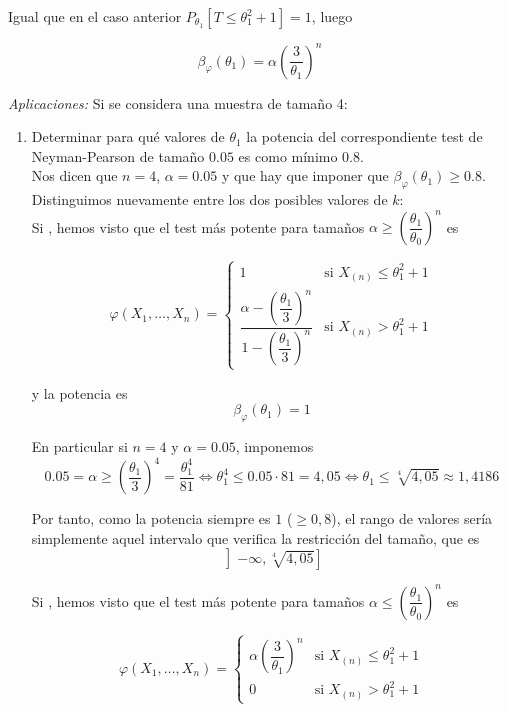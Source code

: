 \documentclass[12pt]{article}
\begin{document}
\begin{ejercicio}
        Igual que en el caso anterior $P_{\theta_1}[T \leq \theta_1^2 + 1] = 1$, luego

        $$\beta_{\varphi}(\theta_1) = \alpha \left( \dfrac{3}{\theta_1} \right)^{n}$$

        \textit{Aplicaciones:} Si se considera una muestra de tamaño 4:
        \begin{enumerate}[label=\alph*)]
            \item Determinar para qué valores de $\theta_1$ la potencia del correspondiente test de Neyman-Pearson de tamaño $0.05$ es como mínimo $0.8$. \\
            
            Nos dicen que $n=4$, $\alpha = 0.05$ y que hay que imponer que $\beta_{\varphi}(\theta_1) \geq 0.8$. Distinguimos nuevamente
            entre los dos posibles valores de $k$: \\

            Si , hemos visto que el test más potente para tamaños $\alpha \geq \left( \dfrac{\theta_1}{\theta_0} \right)^{n}$ es

            $$\varphi(X_1, \ldots, X_n) = 
            \begin{cases}
                1 &\text{si } X_{(n)} \leq \theta_1^2 + 1 \\
                \dfrac{\alpha - \left( \dfrac{\theta_1}{3} \right)^{n}}{1 - \left( \dfrac{\theta_1}{3} \right)^{n}} &\text{si } X_{(n)} > \theta_1^2 + 1
            \end{cases}$$  

            y la potencia es $$\beta_{\varphi}(\theta_1) = 1$$

            En particular si $n=4$ y $\alpha = 0.05$, imponemos
            $$0.05 = \alpha \geq \left( \dfrac{\theta_1}{3} \right)^{4} = \dfrac{\theta_1^4}{81} \iff \theta_1^4 \leq 0.05 \cdot 81 = 4,05 \iff
            \theta_1 \leq \sqrt[4]{4,05} \approx 1,4186$$

            Por tanto, como la potencia siempre es $1$ ($\geq 0,8$), el rango de valores sería simplemente aquel intervalo que verifica
            la restricción del tamaño, que es $$\left]-\infty, \sqrt[4]{4,05} \right]$$ 

            \newpage

            Si , hemos visto que el test más potente para tamaños $\alpha \leq \left( \dfrac{\theta_1}{\theta_0} \right)^{n}$ es

            $$\varphi(X_1, \ldots, X_n) = 
            \begin{cases}
                \alpha \left( \dfrac{3}{\theta_1} \right)^{n} &\text{si } X_{(n)} \leq \theta_1^2 + 1 \\
                0 &\text{si } X_{(n)} > \theta_1^2 + 1
            \end{cases}$$


\end{enumerate}
\end{ejercicio}
\end{document}
